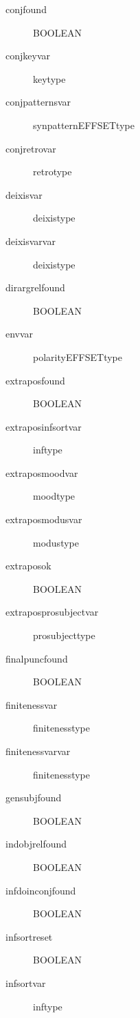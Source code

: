 \begin{description}
\item [conjfound          ] BOOLEAN\\
\item [conjkeyvar         ] keytype\\
\item [conjpatternsvar    ] synpatternEFFSETtype\\
\item [conjretrovar       ] retrotype\\
\item [deixisvar          ] deixistype\\
\item [deixisvarvar       ] deixistype\\
\item [dirargrelfound     ] BOOLEAN\\
\item [envvar             ] polarityEFFSETtype\\
\item [extraposfound      ] BOOLEAN\\
\item [extraposinfsortvar ] inftype\\
\item [extraposmoodvar    ] moodtype\\
\item [extraposmodusvar   ] modustype\\
\item [extraposok         ] BOOLEAN\\
\item [extraposprosubjectvar ] prosubjecttype\\
\item [finalpuncfound     ] BOOLEAN\\
\item [finitenessvar      ] finitenesstype\\
\item [finitenessvarvar   ] finitenesstype\\
\item [gensubjfound       ] BOOLEAN\\
\item [indobjrelfound     ] BOOLEAN\\
\item [infdoinconjfound   ] BOOLEAN\\
\item [infsortreset       ] BOOLEAN\\
\item [infsortvar         ] inftype\\

\end{description}
